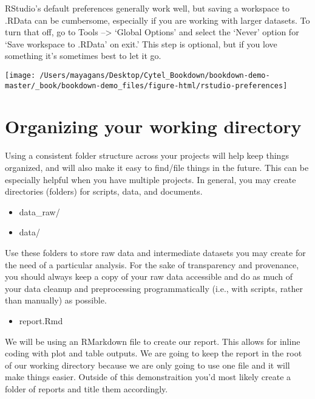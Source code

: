 \documentclass[]{book}
\providecommand{\tightlist}{%
  \setlength{\itemsep}{0pt}\setlength{\parskip}{0pt}}
\begin{document}
RStudio's default preferences generally work well, but saving a workspace to .RData can be cumbersome, especially if you are working with larger datasets. To turn that off, go to Tools --\textgreater{} `Global Options' and select the `Never' option for `Save workspace to .RData' on exit.' This step is optional, but if you love something it's sometimes best to let it go.

\begin{center}\texttt{[image: /Users/mayagans/Desktop/Cytel\_Bookdown/bookdown-demo-master/\_book/bookdown-demo\_files/figure-html/rstudio-preferences]} \end{center}

\hypertarget{organizing-your-working-directory}{%
\section{Organizing your working directory}\label{organizing-your-working-directory}}

Using a consistent folder structure across your projects will help keep things organized, and will also make it easy to find/file things in the future. This can be especially helpful when you have multiple projects. In general, you may create directories (folders) for scripts, data, and documents.

\begin{itemize}
\tightlist
\item
  data\_raw/
\item
  data/
\end{itemize}

Use these folders to store raw data and intermediate datasets you may create for the need of a particular analysis. For the sake of transparency and provenance, you should always keep a copy of your raw data accessible and do as much of your data cleanup and preprocessing programmatically (i.e., with scripts, rather than manually) as possible.

\begin{itemize}
\tightlist
\item
  report.Rmd
\end{itemize}

We will be using an RMarkdown file to create our report. This allows for inline coding with plot and table outputs. We are going to keep the report in the root of our working directory because we are only going to use one file and it will make things easier. Outside of this demonstraition you'd most likely create a folder of reports and title them accordingly.
\end{document}

